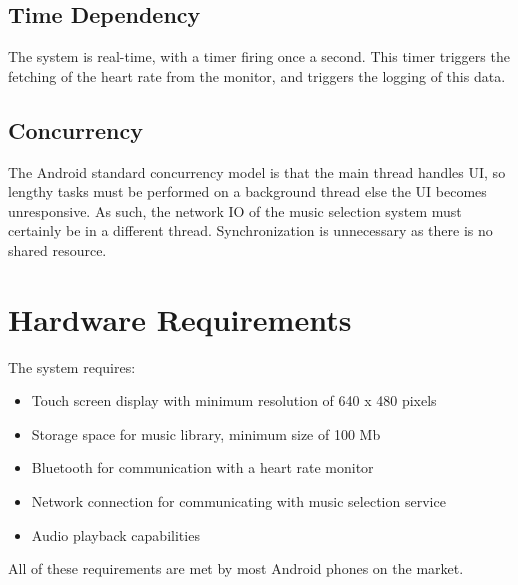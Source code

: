 \documentclass[letterpaper,english, 12pt]{scrreprt}
\begin{document}
\subsection{Time Dependency}
The system is real-time, with a timer firing once a second.
This timer triggers the fetching of the heart rate from the monitor, and triggers the logging of this data.

\subsection{Concurrency}
The Android standard concurrency model is that the main thread handles UI, so lengthy tasks must be performed on a background thread else the UI becomes unresponsive.
As such, the network IO of the music selection system must certainly be in a different thread.
Synchronization is unnecessary as there is no shared resource.

\section{Hardware Requirements}
The system requires:
\begin{itemize}
  \item Touch screen display with minimum resolution of 640 x 480 pixels
  \item Storage space for music library, minimum size of 100 Mb
  \item Bluetooth for communication with a heart rate monitor
  \item Network connection for communicating with music selection service
  \item Audio playback capabilities
\end{itemize}
All of these requirements are met by most Android phones on the market.
\end{document}

